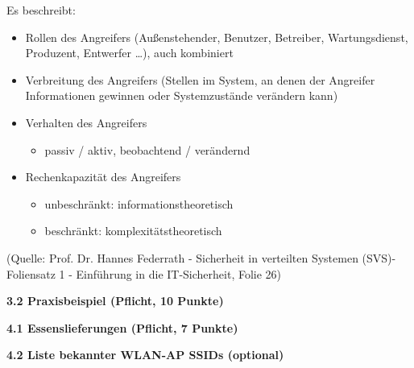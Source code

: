 \documentclass[ngerman]{fbi-aufgabenblatt}
\begin{document}
Es beschreibt:
\begin{itemize}
\item Rollen des Angreifers (Außenstehender, Benutzer, Betreiber,
Wartungsdienst, Produzent, Entwerfer …), auch kombiniert
\item Verbreitung des Angreifers (Stellen im System, an denen der
Angreifer Informationen gewinnen oder Systemzustände verändern kann)\\
\item Verhalten des Angreifers
	\begin{itemize}
   \item passiv / aktiv, beobachtend / verändernd
   \end{itemize}
\item Rechenkapazität des Angreifers
	\begin{itemize}
   \item unbeschränkt: informationstheoretisch
   \item beschränkt: komplexitätstheoretisch
   \end{itemize}
\end{itemize}

(Quelle: Prof. Dr. Hannes Federrath - Sicherheit in verteilten Systemen (SVS)-Foliensatz 1 - \dq Einführung in die IT-Sicherheit\dq , Folie 26)

\textbf{3.2 Praxisbeispiel (Pflicht, 10 Punkte)}

%
%
\newpage
{}

\textbf{4.1 Essenslieferungen (Pflicht, 7 Punkte)}

\textbf{4.2 Liste bekannter WLAN-AP SSIDs (optional)}


\newpage
{}






\end{document}

